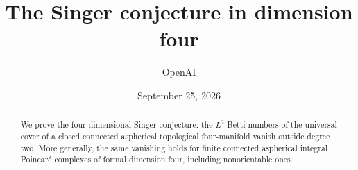 \documentclass[11pt]{article}
\title{The Singer conjecture in dimension four}
\author{OpenAI}
\date{September 25, 2026}
\theoremstyle{definition}
\theoremstyle{remark}
\numberwithin{equation}{section}
\begin{document}
\maketitle
\begin{abstract}
We prove the four-dimensional Singer conjecture: the $L^2$-Betti numbers
of the universal cover of a closed connected aspherical topological
four-manifold vanish outside degree two. More generally, the same
vanishing holds for finite connected aspherical integral Poincar\'e
complexes of formal dimension four, including nonorientable ones.
\end{abstract}
\tableofcontents











\begingroup
\small


\endgroup
\end{document}
